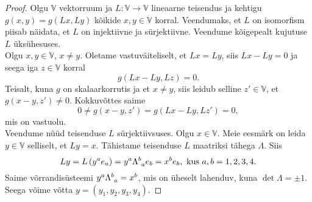 \documentclass[a4paper,12pt]{article}
\theoremstyle{plain}
\theoremstyle{definition}
\numberwithin{equation}{section}
\begin{document}
\begin{proof}
Olgu $\mathbb{V}$ vektorruum ja $L : \mathbb{V} \rightarrow \mathbb{V}$ lineaarne teisendus ja kehtigu $g \left(x, y\right) = g \left(Lx, Ly\right)$ kõikide $x, y \in \mathbb{V}$ korral. Veendumaks, et $L$ on isomorfism piisab näidata, et $L$ on injektiivne ja sürjektiivne. Veendume kõigepealt kujutuse $L$ üksühesuses.\\
Olgu $x, y \in \mathbb{V}$, $x \neq y$. Oletame vastuväiteliselt, et $Lx = Ly$, siis $Lx - Ly = 0$ ja seega iga $z \in \mathbb{V}$ korral
\begin{equation*}
g \left( Lx - Ly, Lz \right) = 0.
\end{equation*}
Teisalt, kuna $g$ on skalaarkorrutis ja et $x \neq y$, siis leidub selline $z' \in \mathbb{V}$, et $g \left( x - y, z' \right) \neq 0$. Kokkuvõttes saime
\begin{equation*}
0 \neq g \left (x-y,z'\right ) = g\left (Lx - Ly, Lz'\right ) = 0,
\end{equation*}
mis on vastuolu. \\
Veendume nüüd teisenduse $L$ sürjektiivsuses. Olgu $x \in \mathbb{V}$. Meie eesmärk on leida $y \in \mathbb{V}$ selliselt, et $Ly = x$. Tähistame teisenduse $L$ maatriksi tähega $\Lambda$. Siis
\[Ly = L\left(y^a e_a\right) = y^a \Lambda\indices{^b_a}e_b = x^b e_b, \text{ kus } a,b = 1,2,3,4.\]
Saime võrrandisüsteemi $y^a \Lambda\indices{^b_a} = x^b$, mis on üheselt lahenduv, kuna $\det \Lambda = \pm 1$. Seega võime võtta $y = (y_1, y_2, y_3, y_4)$.
\end{proof}
\end{document}
